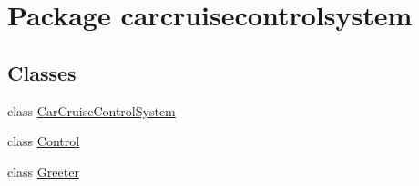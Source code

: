 \hypertarget{namespacecarcruisecontrolsystem}{\section{Package carcruisecontrolsystem}
\label{namespacecarcruisecontrolsystem}
}
\subsection*{Classes}
\begin{DoxyCompactItemize}
\item 
class \hyperlink{classcarcruisecontrolsystem_1_1CarCruiseControlSystem}{Car\-Cruise\-Control\-System}
\item 
class \hyperlink{classcarcruisecontrolsystem_1_1Control}{Control}
\item 
class \hyperlink{classcarcruisecontrolsystem_1_1Greeter}{Greeter}
\end{DoxyCompactItemize}
